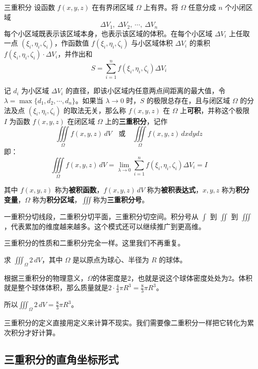\begin{definition}{三重积分}{}
设函数 \(f(x,y,z)\) 在有界闭区域 \(\Omega\) 上有界。将 \(\Omega\) 任意分成 \(n\) 个小闭区域
\[
\Delta V_1,\ \Delta V_2,\ \cdots,\ \Delta V_n
\]
每个小区域既表示该区域本身，也表示该区域的体积。在每个小区域 \(\Delta V_i\) 上任取一点 \((\xi_i,\eta_i,\zeta_i)\)，作函数值 \(f(\xi_i,\eta_i,\zeta_i)\) 与小区域体积 \(\Delta V_i\) 的乘积 \(f(\xi_i,\eta_i,\zeta_i) \cdot \Delta V_i\)，并作出和
\[
S = \sum_{i=1}^{n} f(\xi_i,\eta_i,\zeta_i) \Delta V_i
\]

记 \(d_i\) 为小区域 \(\Delta V_i\) 的直径，即该小区域内任意两点间距离的最大值，令 \(\lambda = \max\{d_1,d_2,\cdots,d_n\}\)。如果当 \(\lambda \to 0\) 时，\(S\) 的极限总存在，且与闭区域 \(\Omega\) 的分法及点 \((\xi_i,\eta_i,\zeta_i)\) 的取法无关，那么称 \(f(x,y,z)\) 在 \(\Omega\) 上\textbf{可积}，并称这个极限 \(I\) 为函数 \(f(x,y,z)\) 在闭区域 \(\Omega\) 上的\textbf{三重积分}，记作
\[
\iiint\limits_{\Omega} f(x,y,z)\,dV
\quad\text{或}\quad
\iiint\limits_{\Omega} f(x,y,z)\,dxdydz
\]
即：
\[
\iiint\limits_{\Omega} f(x,y,z)\,dV = \lim_{\lambda \to 0} \sum_{i=1}^{n} f(\xi_i,\eta_i,\zeta_i) \Delta V_i = I
\]

其中 \(f(x,y,z)\) 称为\textbf{被积函数}，\(f(x,y,z)\,dV\) 称为\textbf{被积表达式}，\(x,y,z\) 称为\textbf{积分变量}，\(\Omega\) 称为\textbf{积分区域}，$\iiint$称为\textbf{三重积分号}。
\end{definition}

一重积分切线段，二重积分切平面，三重积分切空间。积分号从 $\int$ 到 $\iint$ 到 $\iiint$，代表累加的维度越来越多。这个模式还可以继续推广到更高维。

三重积分的性质和二重积分完全一样。这里我们不再重复。


\begin{myexample}
  求 $\iiint_\Omega 2\, dV$，其中 $\Omega$ 是以原点为球心、半径为 $R$ 的球体。

  根据三重积分的物理意义，$\Omega$的体密度是$2$，也就是说这个球体密度处处为$2$。体积就是整个球体体积，那么质量就是$2\cdot \frac43 \pi R^3=\frac83 \pi R^3$。

所以$\iiint_\Omega 2\, dV=\frac83 \pi R^3$。
\end{myexample}

三重积分的定义直接用定义来计算不现实。我们需要像二重积分一样把它转化为累次积分才好计算。

\subsection{三重积分的直角坐标形式}

